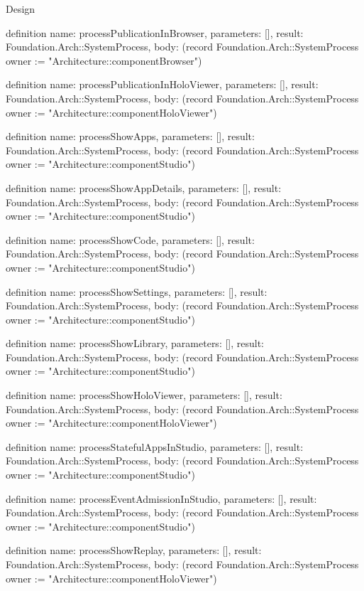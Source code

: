 \begin{lexlean}{Design}
\begin{semanticmodule}
definition{
  name: processPublicationInBrowser,
  parameters: [],
  result: Foundation.Arch::SystemProcess,
  body: (record Foundation.Arch::SystemProcess {owner := "Architecture::componentBrowser"})
}

definition{
  name: processPublicationInHoloViewer,
  parameters: [],
  result: Foundation.Arch::SystemProcess,
  body: (record Foundation.Arch::SystemProcess {owner := "Architecture::componentHoloViewer"})
}

definition{
  name: processShowApps,
  parameters: [],
  result: Foundation.Arch::SystemProcess,
  body: (record Foundation.Arch::SystemProcess {owner := "Architecture::componentStudio"})
}

definition{
  name: processShowAppDetails,
  parameters: [],
  result: Foundation.Arch::SystemProcess,
  body: (record Foundation.Arch::SystemProcess {owner := "Architecture::componentStudio"})
}

definition{
  name: processShowCode,
  parameters: [],
  result: Foundation.Arch::SystemProcess,
  body: (record Foundation.Arch::SystemProcess {owner := "Architecture::componentStudio"})
}

definition{
  name: processShowSettings,
  parameters: [],
  result: Foundation.Arch::SystemProcess,
  body: (record Foundation.Arch::SystemProcess {owner := "Architecture::componentStudio"})
}

definition{
  name: processShowLibrary,
  parameters: [],
  result: Foundation.Arch::SystemProcess,
  body: (record Foundation.Arch::SystemProcess {owner := "Architecture::componentStudio"})
}

definition{
  name: processShowHoloViewer,
  parameters: [],
  result: Foundation.Arch::SystemProcess,
  body: (record Foundation.Arch::SystemProcess {owner := "Architecture::componentHoloViewer"})
}

definition{
  name: processStatefulAppsInStudio,
  parameters: [],
  result: Foundation.Arch::SystemProcess,
  body: (record Foundation.Arch::SystemProcess {owner := "Architecture::componentStudio"})
}

definition{
  name: processEventAdmissionInStudio,
  parameters: [],
  result: Foundation.Arch::SystemProcess,
  body: (record Foundation.Arch::SystemProcess {owner := "Architecture::componentStudio"})
}

definition{
  name: processShowReplay,
  parameters: [],
  result: Foundation.Arch::SystemProcess,
  body: (record Foundation.Arch::SystemProcess {owner := "Architecture::componentHoloViewer"})
}


\end{semanticmodule}
\end{lexlean}
